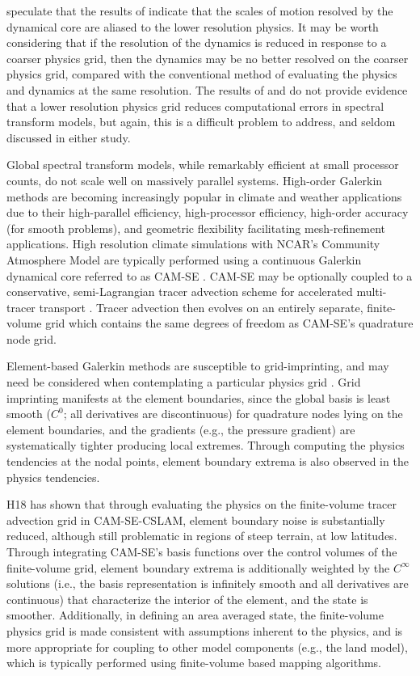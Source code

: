 \documentclass{agujournal}
\begin{document}
\cite{HR2017JCLIM} speculate that the results of \cite{W1999T} indicate that the scales of motion resolved by the dynamical core are aliased to the lower resolution physics. It may be worth considering that if the resolution of the dynamics is reduced in response to a coarser physics grid, then the dynamics may be no better resolved on the coarser physics grid, compared with the conventional method of evaluating the physics and dynamics at the same resolution. The results of \cite{W1999T} and \cite{W2014PTRSL} do not provide evidence that a lower resolution physics grid reduces computational errors in spectral transform models, but again, this is a difficult problem to address, and seldom discussed in either study.  

Global spectral transform models, while remarkably efficient at small processor counts, do not scale well on massively parallel systems. High-order Galerkin methods are becoming increasingly popular in climate and weather applications due to their high-parallel efficiency, high-processor efficiency, high-order accuracy (for smooth problems), and geometric flexibility facilitating mesh-refinement applications. High resolution climate simulations with NCAR's Community Atmosphere Model \citep[CAM;][]{CAM5} are typically performed using a continuous Galerkin dynamical core referred to as CAM-SE \citep[CAM Spectral Elements;][]{TES2008JPCS,DetAl2012IJHPCA,LetAl2018JAMES}. CAM-SE may be optionally coupled to a conservative, semi-Lagrangian tracer advection scheme for accelerated multi-tracer transport \citep[CAM-SE-CSLAM;][]{LTOUNGK2017MWR}. Tracer advection then evolves on an entirely separate, finite-volume grid which contains the same degrees of freedom as CAM-SE's quadrature node grid.

Element-based Galerkin methods are susceptible to grid-imprinting, and may need be considered when contemplating a particular physics grid \citep[][hereafter referred to as H18]{HL2018MWR}. Grid imprinting manifests at the element boundaries, since the global basis is least smooth ($C^{0}$; all derivatives are discontinuous) for quadrature nodes lying on the element boundaries, and the gradients (e.g., the pressure gradient) are systematically tighter producing local extremes. Through computing the physics tendencies at the nodal points, element boundary extrema is also observed in the physics tendencies. 

H18 has shown that through evaluating the physics on the finite-volume tracer advection grid in CAM-SE-CSLAM, element boundary noise is substantially reduced, although still problematic in regions of steep terrain, at low latitudes. Through integrating CAM-SE's basis functions over the control volumes of the finite-volume grid, element boundary extrema is additionally weighted by the $C^{\infty}$ solutions (i.e., the basis representation is infinitely smooth and all derivatives are continuous) that characterize the interior of the element, and the state is smoother. Additionally, in defining an area averaged state, the finite-volume physics grid is made consistent with assumptions inherent to the physics, and is more appropriate for coupling to other model components (e.g., the land model), which is typically performed using finite-volume based mapping algorithms.
\end{document}
